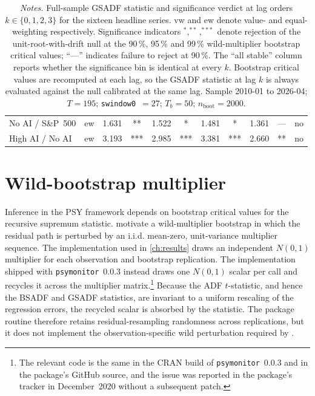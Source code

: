 \begin{table}[t]
\begin{tabular}{l c S[table-format=1.3] c S[table-format=1.3] c S[table-format=1.3] c S[table-format=1.3] c c}
No AI / S\&P~500           & ew & 1.631 & **  & 1.522 & *   & 1.481 & *   & 1.361 & --- & no  \\
High AI / No AI            & ew & 3.193 & *** & 2.985 & *** & 3.381 & *** & 2.660 & **  & no  \\
\bottomrule
\end{tabular}
\caption*{\footnotesize \textit{Notes.} Full-sample GSADF statistic and significance verdict at lag orders $k\in\{0,1,2,3\}$ for the sixteen headline series. vw and ew denote value- and equal-weighting respectively. Significance indicators $^{*}, ^{**}, ^{***}$ denote rejection of the unit-root-with-drift null at the 90\,\%, 95\,\% and 99\,\% wild-multiplier bootstrap critical values; ``---'' indicates failure to reject at 90\,\%. The ``all stable'' column reports whether the significance bin is identical at every $k$. Bootstrap critical values are recomputed at each lag, so the GSADF statistic at lag $k$ is always evaluated against the null calibrated at the same lag. Sample 2010-01 to 2026-04; $T = \num{195}$; \texttt{swindow0}~$=27$; $T_b=50$; $n_{\mathrm{boot}} = \num{2000}$.}
\end{table}


\section{Wild-bootstrap multiplier}
\label{sec:rob-wild}

Inference in the PSY framework depends on bootstrap critical values for the recursive supremum statistic. \citet{harveyEtAl2016} motivate a wild-multiplier bootstrap in which the residual path is perturbed by an i.i.d. mean-zero, unit-variance multiplier sequence. The implementation used in \cref{ch:results} draws an independent $N(0,1)$ multiplier for each observation and bootstrap replication. The implementation shipped with \texttt{psymonitor}~0.0.3 instead draws one $N(0,1)$ scalar per call and recycles it across the multiplier matrix.\footnote{The relevant code is the same in the CRAN build of \texttt{psymonitor}~0.0.3 and in the package's GitHub source, and the issue was reported in the package's tracker in December~2020 without a subsequent patch.} Because the ADF $t$-statistic, and hence the BSADF and GSADF statistics, are invariant to a uniform rescaling of the regression errors, the recycled scalar is absorbed by the statistic. The package routine therefore retains residual-resampling randomness across replications, but it does not implement the observation-specific wild perturbation required by \citet{harveyEtAl2016}.

